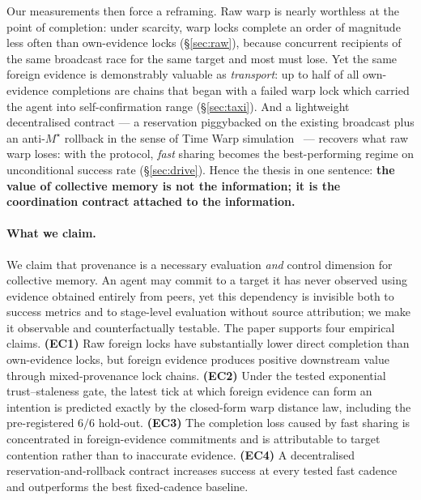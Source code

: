 \documentclass{article}
\newcommand{\mstar}{M^{\star}}
\begin{document}
Our measurements then force a reframing. Raw warp is nearly worthless
at the point of completion: under scarcity, warp locks complete an
order of magnitude less often than own-evidence locks
(\S\ref{sec:raw}), because concurrent recipients of the same broadcast
race for the same target and most must lose. Yet the same foreign
evidence is demonstrably valuable as \emph{transport}: up to half of
all own-evidence completions are chains that began with a failed warp
lock which carried the agent into self-confirmation range
(\S\ref{sec:taxi}). And a lightweight decentralised contract --- a
reservation piggybacked on the existing broadcast plus an
anti-$\mstar$ rollback in the sense of Time Warp
simulation~\cite{jefferson1985}
--- recovers what raw warp loses: with the protocol, \emph{fast}
sharing becomes the best-performing regime on unconditional success
rate (\S\ref{sec:drive}). Hence the thesis in one sentence:
\textbf{the value of collective memory is not the information; it is
the coordination contract attached to the information.}

\paragraph{What we claim.} We claim that provenance is a necessary
evaluation \emph{and} control dimension for collective memory. An
agent may commit to a target it has never observed using evidence
obtained entirely from peers, yet this dependency is invisible both
to success metrics and to stage-level evaluation without source
attribution; we make it observable and counterfactually testable.
The paper supports four empirical claims. \textbf{(EC1)} Raw foreign
locks have substantially lower direct completion than own-evidence
locks, but foreign evidence produces positive downstream value
through mixed-provenance lock chains. \textbf{(EC2)} Under the tested
exponential trust--staleness gate, the latest tick at which foreign
evidence can form an intention is predicted exactly by the
closed-form warp distance law, including the pre-registered $6/6$
hold-out. \textbf{(EC3)} The completion loss caused by fast sharing
is concentrated in foreign-evidence commitments and is attributable
to target contention rather than to inaccurate evidence.
\textbf{(EC4)} A decentralised reservation-and-rollback contract
increases success at every tested fast cadence and outperforms the
best fixed-cadence baseline.
\end{document}
